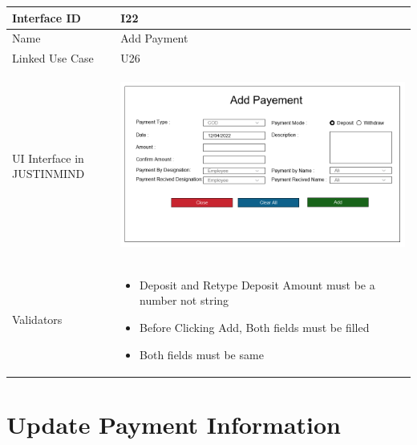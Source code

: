 \documentclass[12pt,a4paper]{report}
\begin{document}
\begin{tabular}{ | m{3cm} | m{12cm}| } \hline

Interface ID & I22  \\\hline

Name  &  Add Payment \\ \hline

Linked Use Case & U26	 \\ \hline

UI Interface in JUSTINMIND & \begin{center} \includegraphics[scale=0.3]{./User Interface/UI-021 Add Payment@1x.png}\end{center}  \\ \hline

Validators & 
\begin{itemize}
\item   Deposit and Retype Deposit Amount must be a number not string
\item  Before Clicking Add, Both fields must be filled
\item  Both fields must be same


\end{itemize}
\\ \hline

\end{tabular} 
\section{Update Payment Information}
\end{document}
